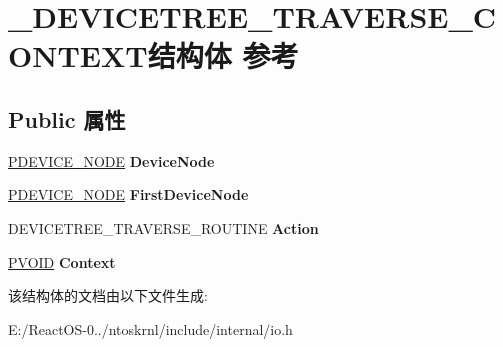 \hypertarget{struct___d_e_v_i_c_e_t_r_e_e___t_r_a_v_e_r_s_e___c_o_n_t_e_x_t}{}\section{\+\_\+\+D\+E\+V\+I\+C\+E\+T\+R\+E\+E\+\_\+\+T\+R\+A\+V\+E\+R\+S\+E\+\_\+\+C\+O\+N\+T\+E\+X\+T结构体 参考}
\label{struct___d_e_v_i_c_e_t_r_e_e___t_r_a_v_e_r_s_e___c_o_n_t_e_x_t}
\subsection*{Public 属性}
\begin{DoxyCompactItemize}
\item 
\mbox{\label{struct___d_e_v_i_c_e_t_r_e_e___t_r_a_v_e_r_s_e___c_o_n_t_e_x_t_aab7f95f671be5db1b2b55445167b2602}} 
\hyperlink{struct___d_e_v_i_c_e___n_o_d_e}{P\+D\+E\+V\+I\+C\+E\+\_\+\+N\+O\+DE} {\bfseries Device\+Node}
\item 
\mbox{\label{struct___d_e_v_i_c_e_t_r_e_e___t_r_a_v_e_r_s_e___c_o_n_t_e_x_t_a08f1eba7d01a887c75504799e7ded06d}} 
\hyperlink{struct___d_e_v_i_c_e___n_o_d_e}{P\+D\+E\+V\+I\+C\+E\+\_\+\+N\+O\+DE} {\bfseries First\+Device\+Node}
\item 
\mbox{\label{struct___d_e_v_i_c_e_t_r_e_e___t_r_a_v_e_r_s_e___c_o_n_t_e_x_t_aac0794ebebbdd75bfd8c210109d1a169}} 
D\+E\+V\+I\+C\+E\+T\+R\+E\+E\+\_\+\+T\+R\+A\+V\+E\+R\+S\+E\+\_\+\+R\+O\+U\+T\+I\+NE {\bfseries Action}
\item 
\mbox{\label{struct___d_e_v_i_c_e_t_r_e_e___t_r_a_v_e_r_s_e___c_o_n_t_e_x_t_a74c78811538fadb7e7923689f2c4691d}} 
\hyperlink{interfacevoid}{P\+V\+O\+ID} {\bfseries Context}
\end{DoxyCompactItemize}


该结构体的文档由以下文件生成\+:\begin{DoxyCompactItemize}
\item 
E\+:/\+React\+O\+S-\/0../ntoskrnl/include/internal/io.\+h\end{DoxyCompactItemize}
